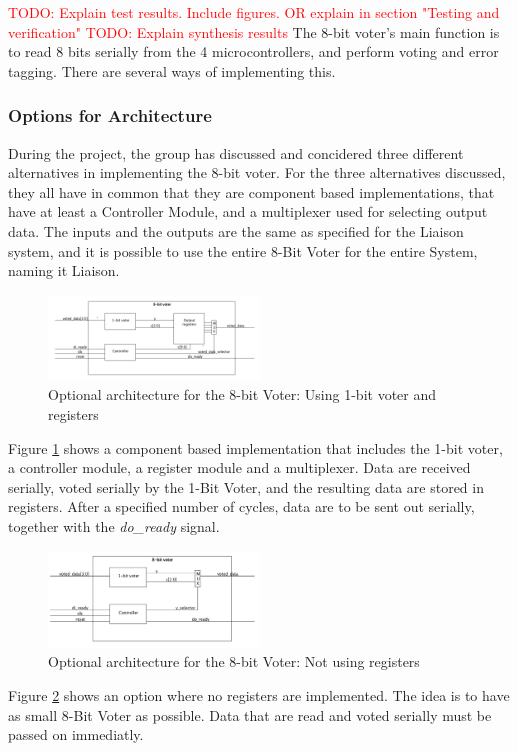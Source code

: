 \documentclass[a4paper]{IEEEtran}
\newcommand\TODO[1]{\textcolor{red}{TODO:#1}}
\newcommand\todo[1]{\TODO{#1}}
\begin{document}
\todo{ Explain test results. Include figures. OR explain in section "Testing and verification" }
\break
\break
\todo{ Explain synthesis results}
\break
\break
The 8-bit voter's main function is to read 8 bits serially from the 4 microcontrollers, and perform voting and error tagging. 
There are several ways of implementing this.

\subsubsection{Options for Architecture}
During the project, the group has discussed and concidered three different alternatives in implementing the 8-bit voter.
For the three alternatives discussed, they all have in common that they are component based implementations, that have at least a Controller Module, and a multiplexer used for selecting output data.
The inputs and the outputs are the same as specified for the Liaison system, and it is possible to use the entire 8-Bit Voter for the entire System, naming it Liaison. 

\begin{figure}[h!]
    \centering
    \includegraphics[width=0.5\textwidth]{Figures/Solution/ArchitectureOption1}
    \caption{Optional architecture for the 8-bit Voter: Using 1-bit voter and registers}
    \label{fig:ArchitectureOption1}
\end{figure}
Figure \ref{fig:ArchitectureOption1} shows a component based implementation that includes the 1-bit voter, a controller module, a register module and a multiplexer. Data are received serially, voted serially by the 1-Bit Voter, and the resulting data are stored in registers. After a specified number of cycles, data are to be sent out serially, together with the \textit{do\_ready} signal.
\begin{figure}[h!]
    \centering
    \includegraphics[width=0.5\textwidth]{Figures/Solution/ArchitectureOption2}
    \caption{Optional architecture for the 8-bit Voter: Not using registers}
    \label{fig:ArchitectureOption2}
\end{figure}
Figure \ref{fig:ArchitectureOption2} shows an option where no registers are implemented. 
The idea is to have as small 8-Bit Voter as possible. 
Data that are read and voted serially must be passed on immediatly.
\end{document}
